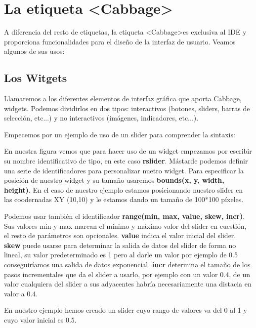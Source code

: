 \section{La etiqueta \textless Cabbage\textgreater}\label{sec:CabbageInst}

A diferencia del resto de etiquetas, la etiqueta \textless Cabbage\textgreater es exclusiva al IDE y proporciona funcionalidades para el diseño de la interfaz de usuario. Veamos algunos de sus usos:

\subsection{Los Witgets}

Llamaremos a los diferentes elementos de interfaz gráfica que aporta Cabbage, widgets. Podemos dividirlos en dos tipos: interactivos (botones, sliders, barras de selección, etc...) y no interactivos (imágenes, indicadores, etc...).

Empecemos por un ejemplo de uso de un slider para comprender la sintaxis:


En nuestra figura vemos que para hacer uso de un widget empezamos por escribir su nombre identificativo de tipo, en este caso \textbf{rslider}. Mástarde podemos definir una serie de identificadores para personalizar nuetro widget. Para especificar la posición de nuestro widget y su tamaño usaremos \textbf{bounds(x, y, width, height)}. En el caso de nuestro ejemplo estamos posicionando nuestro slider en las coodernadas XY (10,10) y le estamos dando un tamaño de 100*100 píxeles.

Podemos usar también el identificador \textbf{range(min, max, value, skew, incr)}. Sus valores min y max marcan el mínimo y máximo valor del slider en cuestión, el resto de parámetros son opcionales. \textbf{value} indica el valor inicial del slider. \textbf{skew} puede usarse para determinar la salida de datos del slider de forma no lineal, su valor predeterminado es 1 pero al darle un valor por ejemplo de 0.5 conseguiríamos una salida de datos exponencial. \textbf{incr} determina el tamaño de los pasos incrementales que da el slider a usarlo, por ejemplo con un valor 0.4, de un valor cualquiera del slider a sus adyacentes habría necesariamente una distacia en valor a 0.4.

En nuestro ejemplo hemos creado un slider cuyo rango de valores va del 0 al 1 y cuyo valor inicial es 0.5.



